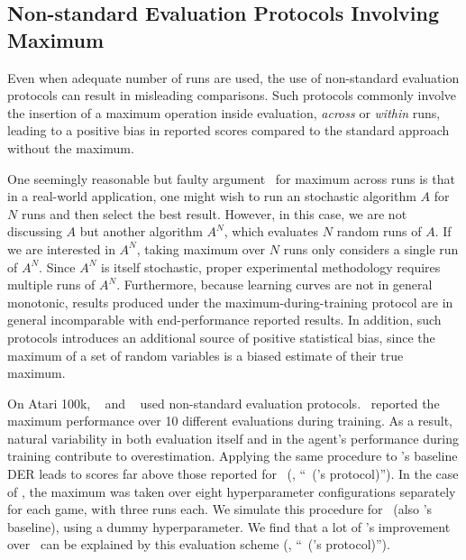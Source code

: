 \vspace{-0.2cm}
\subsection{Non-standard Evaluation Protocols Involving Maximum}
\label{sec:non_standard_eval_appendix}
Even when adequate number of runs are used, the use of non-standard evaluation protocols can result in misleading comparisons.  Such protocols commonly involve the insertion of a maximum operation inside evaluation, \emph{across} or \emph{within} runs, leading to a positive bias in reported scores compared to the standard approach without the maximum. %

One seemingly reasonable but faulty argument~\citep{birattari2007assess} for maximum across runs is that in a real-world application, one might wish to run an stochastic algorithm $A$ for $N$ runs and then select the best result. However, in this case, we are not discussing $A$ but another algorithm $A^N$, which evaluates $N$ random runs of $A$. If we are interested in $A^N$, taking maximum over $N$ runs only considers a single run of $A^N$. Since $A^N$ is itself stochastic, proper experimental methodology requires multiple runs of $A^N$. Furthermore, because learning curves are not in general monotonic, results produced under the maximum-during-training protocol are in general incomparable with end-performance reported results. In addition, such protocols introduces an additional source of positive statistical bias, since the maximum of a set of random variables is a biased estimate of their true maximum. 

On Atari 100k, \curl~\citep{laskin2020curl} and \sunrise~\citep{lee2020sunrise} used non-standard evaluation protocols. \curl\ reported the maximum performance over 10 different evaluations during training. As a result, natural variability in both evaluation itself and in the agent's performance during training contribute to overestimation. Applying the same procedure to \curl's baseline DER leads to scores far above those reported for \curl~(, ``\der~(\curl's protocol)''). In the case of \sunrise, the maximum was taken over eight hyperparameter configurations separately for each game, with three runs each.  We simulate this procedure for \der~(also \sunrise's baseline), using a dummy hyperparameter. We find that a lot of \sunrise's improvement over \der\ can be explained by this evaluation scheme (, ``\der~(\sunrise's protocol)'').



